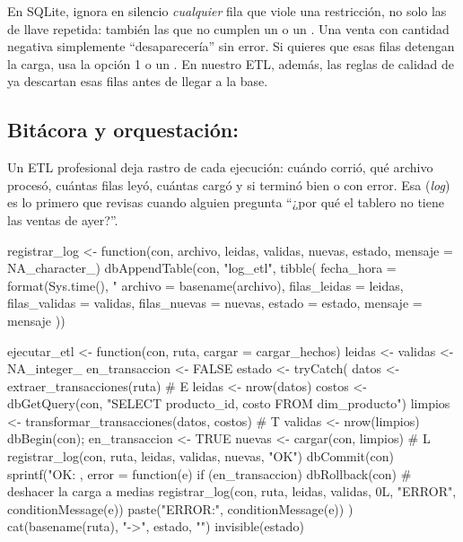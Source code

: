 \begin{advertencia}
En SQLite,  ignora en silencio \emph{cualquier}
fila que viole una restricción, no solo las de llave repetida: también las
que no cumplen un  o un . Una venta con
cantidad negativa simplemente ``desaparecería'' sin error. Si quieres que
esas filas detengan la carga, usa la opción 1 o un . En nuestro ETL, además, las reglas de calidad de
 ya descartan esas filas antes de
llegar a la base.
\end{advertencia}

\subsection{Bitácora y orquestación: \texorpdfstring{}{ejecutar\_etl()}}

Un ETL profesional deja rastro de cada ejecución: cuándo corrió, qué archivo
procesó, cuántas filas leyó, cuántas cargó y si terminó bien o con error.
Esa  (\emph{log}) es lo primero que revisas cuando
alguien pregunta ``¿por qué el tablero no tiene las ventas de ayer?''.

\begin{rcode}
registrar_log <- function(con, archivo, leidas, validas, nuevas,
                          estado, mensaje = NA_character_) {
  dbAppendTable(con, "log_etl", tibble(
    fecha_hora    = format(Sys.time(), "%
    archivo       = basename(archivo),
    filas_leidas  = leidas,  filas_validas = validas,
    filas_nuevas  = nuevas,  estado = estado,  mensaje = mensaje
  ))
}

ejecutar_etl <- function(con, ruta, cargar = cargar_hechos) {
  leidas <- validas <- NA_integer_
  en_transaccion <- FALSE
  estado <- tryCatch({
    datos   <- extraer_transacciones(ruta)                  # E
    leidas  <- nrow(datos)
    costos  <- dbGetQuery(con, "SELECT producto_id, costo
                                FROM dim_producto")
    limpios <- transformar_transacciones(datos, costos)     # T
    validas <- nrow(limpios)
    dbBegin(con); en_transaccion <- TRUE
    nuevas  <- cargar(con, limpios)                         # L
    registrar_log(con, ruta, leidas, validas, nuevas, "OK")
    dbCommit(con)
    sprintf("OK: %
  }, error = function(e) {
    if (en_transaccion) dbRollback(con)     # deshacer la carga a medias
    registrar_log(con, ruta, leidas, validas, 0L, "ERROR",
                  conditionMessage(e))
    paste("ERROR:", conditionMessage(e))
  })
  cat(basename(ruta), "->", estado, "\n")
  invisible(estado)
}
\end{rcode}

